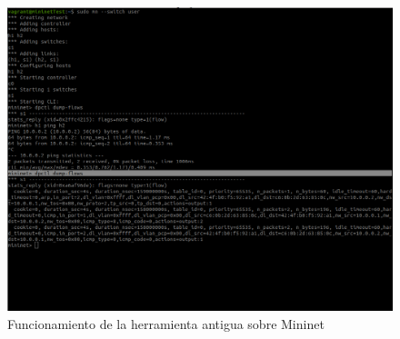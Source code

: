 \newpage

\begin{figure}[ht!]
    \centering
    \includegraphics[width=\textwidth]{archivos/img/dev/dpctl_6.png}
    \caption{Funcionamiento de la herramienta antigua sobre Mininet}
    \label{fig:dpctl_6}
\end{figure}